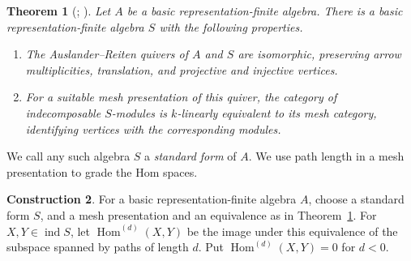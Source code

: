 \documentclass[a4paper,reqno,10pt]{amsart}
\newtheorem{theorem}{Theorem}[section]
\theoremstyle{definition}
\newtheorem{construction}[theorem]{Construction}
\numberwithin{equation}{section}
\DeclareMathOperator{\ind}{ind}
\DeclareMathOperator{\Hom}{Hom}
\begin{document}
\begin{theorem}[{\cite[Sections~2.4, 2.8, 2.9, and~5.1]{BG};
\cite[Section~3.1]{BrG}}]\label{thm:standard}
Let \(A\) be a basic representation-finite algebra. There is a basic
representation-finite algebra \(S\) with the following properties.
\begin{enumerate}
\item The Auslander--Reiten quivers of \(A\) and \(S\)
are isomorphic, preserving arrow multiplicities, translation, and
projective and injective vertices.
\item For a suitable mesh presentation of this quiver, the category of
indecomposable \(S\)-modules is \(k\)-linearly equivalent to its mesh
category, identifying vertices
with the corresponding modules.
\end{enumerate}
\end{theorem}
We call any such algebra \(S\) a \emph{standard form} of \(A\).
We use path length in a mesh presentation to grade the Hom spaces.
\begin{construction}\label{con:hom-grading}
For a basic representation-finite algebra \(A\), choose a standard form
\(S\), and a mesh presentation and an equivalence as in
Theorem~\ref{thm:standard}.
For \(X,Y\in\ind S\), let \(\Hom^{(d)}(X,Y)\) be the image under this
equivalence of the subspace spanned by paths of length \(d\).
Put \(\Hom^{(d)}(X,Y)=0\) for \(d<0\).
\end{construction}
\end{document}
